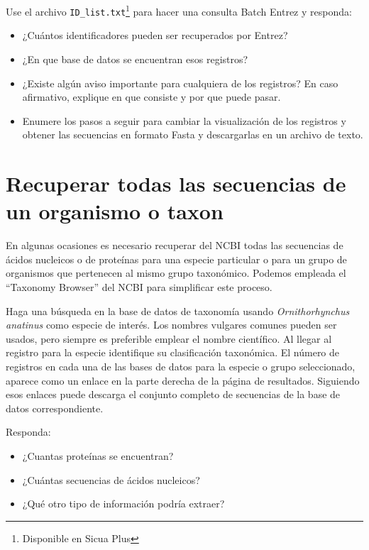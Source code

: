 \documentclass[letter,11pt]{book}
\begin{document}
Use el archivo \Verb+ID_list.txt+\footnote{Disponible en Sicua Plus} para hacer una consulta Batch Entrez y responda:

{\color{red}
\begin{itemize}
\item ¿Cuántos identificadores pueden ser recuperados por Entrez?
\item ¿En que base de datos se encuentran esos registros?
\item ¿Existe algún aviso importante para cualquiera de los registros? En caso afirmativo, explique en que consiste y por que puede pasar.
\item Enumere los pasos a seguir para cambiar la visualización de los registros y obtener las secuencias en formato Fasta y descargarlas en un archivo de texto.
\end{itemize}
}

\section{Recuperar todas las secuencias de un organismo o taxon}

En algunas ocasiones es necesario recuperar del NCBI todas las secuencias de ácidos nucleicos o de proteínas para una especie particular o para un grupo de organismos que pertenecen al mismo grupo taxonómico. Podemos empleada el ``Taxonomy Browser'' del NCBI para simplificar este proceso.

Haga una búsqueda en la base de datos de taxonomía usando \textit{Ornithorhynchus anatinus} como especie de interés. Los nombres vulgares comunes pueden ser usados, pero siempre es preferible emplear el nombre científico.  Al llegar al registro para la especie identifique su clasificación taxonómica. El número de registros en cada una de las bases de datos para la especie o grupo seleccionado, aparece como un enlace en la parte derecha de la página de resultados. Siguiendo esos enlaces puede descarga el conjunto completo de secuencias de la base de datos correspondiente.

Responda:

{\color{red}
\begin{itemize}
\item ¿Cuantas proteínas se encuentran?
\item ¿Cuántas secuencias de ácidos nucleicos?
\item ¿Qué otro tipo de información podría extraer?
\end{itemize}
}
\end{document}
